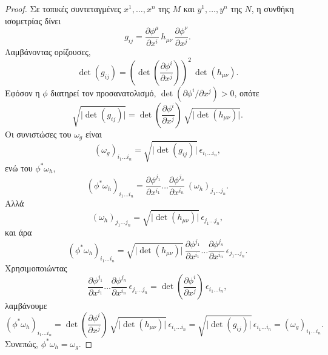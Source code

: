 \documentclass[11pt,a4paper,twoside,openright]{book}
\begin{document}
\begin{proof}
Σε τοπικές συντεταγμένες $x^1, \dots, x^n$ της $M$ και $y^1, \dots, y^n$ της $N$, η συνθήκη ισομετρίας δίνει
\begin{equation*}
g_{ij}
=
\frac{\partial \phi^\mu}{\partial x^i}
\,
h_{\mu\nu}
\,
\frac{\partial \phi^\nu}{\partial x^j}.
\end{equation*}
Λαμβάνοντας ορίζουσες,
\begin{equation*}
\det(g_{ij})
=
\left( \det\left( \frac{\partial \phi^i}{\partial x^j} \right) \right)^2
\,
\det(h_{\mu\nu}).
\end{equation*}
Εφόσον η $\phi$ διατηρεί τον προσανατολισμό, $\det(\partial \phi^i/\partial x^j) > 0$, οπότε
\begin{equation*}
\sqrt{\lvert \det(g_{ij}) \rvert}
=
\det\left( \frac{\partial \phi^i}{\partial x^j} \right)
\,
\sqrt{\lvert \det(h_{\mu\nu}) \rvert}.
\end{equation*}
Οι συνιστώσες του $\omega_g$ είναι
\begin{equation*}
(\omega_g)_{i_1 \dots i_n}
=
\sqrt{\lvert \det(g_{ij}) \rvert}
\,
\epsilon_{i_1 \dots i_n},
\end{equation*}
ενώ του $\phi^* \omega_h$,
\begin{equation*}
(\phi^* \omega_h)_{i_1 \dots i_n}
=
\frac{\partial \phi^{j_1}}{\partial x^{i_1}}
\dots
\frac{\partial \phi^{j_n}}{\partial x^{i_n}}
\,
(\omega_h)_{j_1 \dots j_n}.
\end{equation*}
Αλλά
\begin{equation*}
(\omega_h)_{j_1 \dots j_n}
=
\sqrt{\lvert \det(h_{\mu\nu}) \rvert}
\,
\epsilon_{j_1 \dots j_n},
\end{equation*}
και άρα
\begin{equation*}
(\phi^* \omega_h)_{i_1 \dots i_n}
=
\sqrt{\lvert \det(h_{\mu\nu}) \rvert}
\,
\frac{\partial \phi^{j_1}}{\partial x^{i_1}}
\dots
\frac{\partial \phi^{j_n}}{\partial x^{i_n}}
\,
\epsilon_{j_1 \dots j_n}.
\end{equation*}
Χρησιμοποιώντας
\begin{equation*}
\frac{\partial \phi^{j_1}}{\partial x^{i_1}}
\dots
\frac{\partial \phi^{j_n}}{\partial x^{i_n}}
\,
\epsilon_{j_1 \dots j_n}
=
\det\left( \frac{\partial \phi^i}{\partial x^j} \right)
\,
\epsilon_{i_1 \dots i_n},
\end{equation*}
λαμβάνουμε
\begin{equation*}
(\phi^* \omega_h)_{i_1 \dots i_n}
=
\det\left( \frac{\partial \phi^i}{\partial x^j} \right)
\,
\sqrt{\lvert \det(h_{\mu\nu}) \rvert}
\,
\epsilon_{i_1 \dots i_n}
=
\sqrt{\lvert \det(g_{ij}) \rvert}
\,
\epsilon_{i_1 \dots i_n}
=
(\omega_g)_{i_1 \dots i_n}.
\end{equation*}
Συνεπώς, $\phi^* \omega_h = \omega_g$.
\end{proof}
\end{document}
